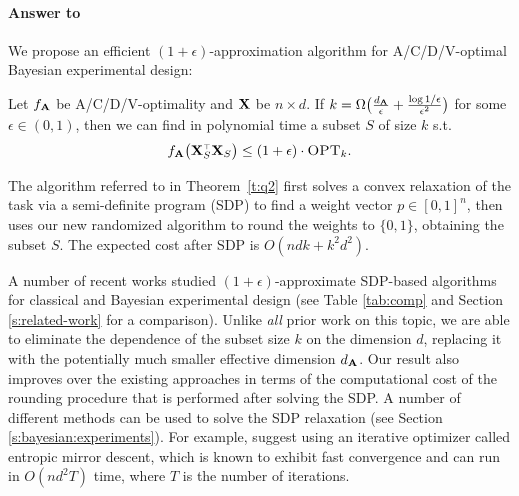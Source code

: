 \documentclass[../../thesis.tex]{subfiles}
\begin{document}
\paragraph{Answer to }
We propose an efficient $(1+\epsilon)$-approximation algorithm for
A/C/D/V-optimal Bayesian  experimental design:
\begin{theorem}\label{t:q2}
  Let $f_{\mathbf A}$ be A/C/D/V-optimality and $\mathbf X$ be $n\times d$. If
  $k=\Omega\big(\frac{d_{\mathbf A}}{\epsilon} +
    \frac{\log1/\epsilon}{\epsilon^2}\big)$ for some $\epsilon\in(0,1)$, then
  we can find in polynomial time a subset $S$ of size $k$ s.t.
  \begin{align*}
    f_{\A}\big(\X_S^\top\X_S\big) \leq (1+\epsilon)\cdot\opt.
  \end{align*}
\end{theorem}
\begin{remark}
  The algorithm referred to in Theorem~\ref{t:q2} first solves a convex
  relaxation of the task via a semi-definite program (SDP) to find a
  weight vector $p\in[0,1]^n$, then uses our new randomized algorithm
  to round the weights to $\{0,1\}$, obtaining the subset
  $S$. The expected cost after SDP is $O(ndk+k^2d^2)$.
\end{remark}

A number of recent works studied $(1+\epsilon)$-approximate SDP-based algorithms
for classical and Bayesian experimental design (see Table
\ref{tab:comp} and Section \ref{s:related-work} for a comparison). Unlike \emph{all} prior work on
this topic, we are able to eliminate the
dependence of the subset size $k$ on the dimension $d$, replacing it
with the potentially much smaller effective dimension $d_\mathbf A$.
Our result also improves over the existing approaches in terms of the computational
cost of the rounding procedure that is performed after solving the SDP. A
number of different methods can be used to solve the SDP relaxation (see
Section \ref{s:bayesian:experiments}). For
example, \cite{near-optimal-design} suggest using an iterative
optimizer called entropic mirror descent, which is known to exhibit
fast convergence and can run in $O(nd^2T)$ time, where $T$ is the
number of iterations.
\end{document}
